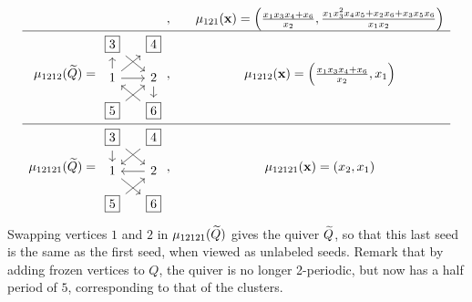 \begin{example}
{\begin{equation*}
\begin{array}{rc}
\begin{tikzcd}[sep=small, ampersand replacement=\&]
					                 \end{tikzcd},\quad                                                  &
					\mu_{121}(\bx) = \left(\frac{x_{1} x_{3} x_{4} + x_{6}}{x_{2}}, \frac{x_{1} x_{3}^{2} x_{4} x_{5} + x_{2} x_{6} + x_{3} x_{5} x_{6}}{x_{1} x_{2}}\right) \\
					\hline
					\mu_{1212}(\tQ) = \begin{tikzcd}[sep=small, ampersand replacement=\&]
						                  \boxed{3} \ar[dr] \& \boxed{4}  \\
						                  1  \uar \rar \urar \& 2 \dar \\
						                  \boxed{5} \urar \& \boxed{6} \ular
					                  \end{tikzcd},\quad                                                 &
					\mu_{1212}(\bx) = \left(\frac{x_{1} x_{3} x_{4} + x_{6}}{x_{2}}, x_1\right)                                                                              \\
					\hline
					\mu_{12121}(\tQ) = \begin{tikzcd}[sep=small, ampersand replacement=\&]
						                   \boxed{3} \dar \drar \& \boxed{4} \dlar \\
						                   1  \drar \& 2 \lar  \\
						                   \boxed{5}\urar \& \boxed{6}
					                   \end{tikzcd},\quad                                                &
					\mu_{12121}(\bx) = \left(x_2, x_1\right)
				\end{array}
			\end{equation*}
		}%
	Swapping vertices $1$ and $2$ in $\mu_{12121}(\widetilde{Q})$ gives the quiver $\widetilde{Q}$, so that
	this last seed is the same as the first seed, when viewed as unlabeled seeds. Remark
	that by adding frozen vertices to $Q$, the quiver is no longer 2-periodic, but now has
	a half period of $5$, corresponding to that of the clusters.


\end{example}
